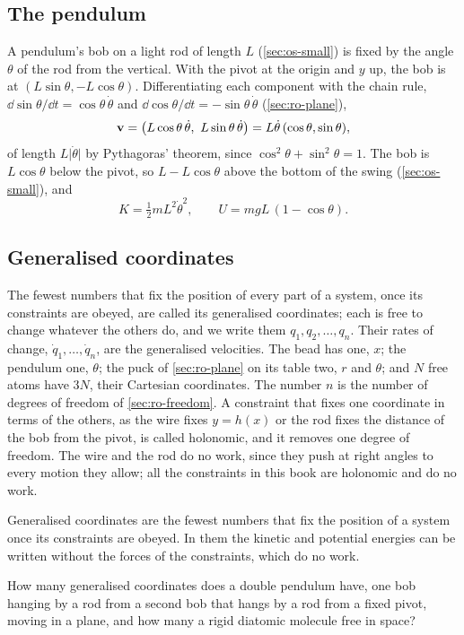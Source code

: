 \subsection*{The pendulum}

A pendulum's bob on a light rod of length $L$ (\cref{sec:os-small}) is
fixed by the angle $\theta$ of the rod from the vertical. With the pivot
at the origin and $y$ up, the bob is at $(L\sin\theta, -L\cos\theta)$.
Differentiating each component with the chain rule, $\dd\sin\theta/\dd t =
\cos\theta\,\dot\theta$ and $\dd\cos\theta/\dd t = -\sin\theta\,\dot\theta$
(\cref{sec:ro-plane}),
\begin{equation*}
   \vb{v} = \bigl(L\cos\theta\,\dot\theta,\ L\sin\theta\,\dot\theta\bigr)
   = L\dot\theta\,(\cos\theta, \sin\theta) ,
\end{equation*}
of length $L\lvert\dot\theta\rvert$ by Pythagoras' theorem, since
$\cos^2\theta + \sin^2\theta = 1$. The bob is $L\cos\theta$ below the
pivot, so $L - L\cos\theta$ above the bottom of the swing
(\cref{sec:os-small}), and
\begin{equation*}
   K = \tfrac12 mL^2\dot\theta^2 ,
   \qquad U = mgL\,(1 - \cos\theta) .
\end{equation*}

\subsection*{Generalised coordinates}

The fewest numbers that fix the position of every part of a system, once
its constraints are obeyed, are called its generalised coordinates; each
is free to change whatever the others do, and we write them $q_1, q_2,
\dots, q_n$. Their rates of change, $\dot{q}_1,
\dots, \dot{q}_n$, are the generalised velocities. The bead has one, $x$;
the pendulum one, $\theta$; the puck of \cref{sec:ro-plane} on its table
two, $r$ and $\theta$; and $N$ free atoms have $3N$, their Cartesian
coordinates. The number $n$ is the number of degrees of freedom of
\cref{sec:ro-freedom}. A constraint that fixes one coordinate in terms of
the others, as the wire fixes $y = h(x)$ or the rod fixes the distance
of the bob from the pivot, is called holonomic, and it removes one degree
of freedom. The wire and the rod do no work, since they push at right
angles to every motion they allow; all the constraints in this book are
holonomic and do no work.

\begin{keyidea}
Generalised coordinates are the fewest numbers that fix the position of
a system once its constraints are obeyed. In them the kinetic and potential
energies can be written without the forces of the constraints, which do
no work.
\end{keyidea}

\begin{selfcheck}
How many generalised coordinates does a double pendulum have, one bob hanging
by a rod from a second bob that hangs by a rod from a fixed pivot, moving
in a plane, and how many a rigid diatomic molecule free in space?
\end{selfcheck}
